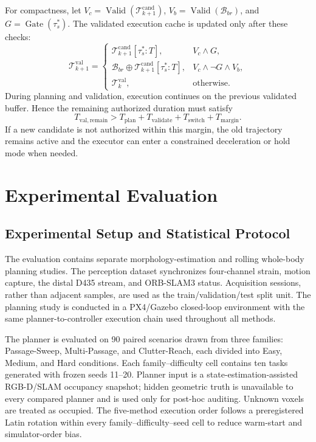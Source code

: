 \documentclass[journal,twoside]{IEEEtran}
\begin{document}
For compactness, let $V_c=\operatorname{Valid}(\mathcal T_{k+1}^{\mathrm{cand}})$, $V_b=\operatorname{Valid}(\mathcal B_{br})$, and $G=\operatorname{Gate}(\tau_s^*)$. The validated execution cache is updated only after these checks:
\begin{equation}
\mathcal T_{k+1}^{\mathrm{val}}=
\begin{cases}
\mathcal T_{k+1}^{\mathrm{cand}}[\tau_s^*:T],&V_c\land G,\\
\mathcal B_{br}\oplus\mathcal T_{k+1}^{\mathrm{cand}}[\tau_s^*:T],
&V_c\land\neg G\land V_b,\\
\mathcal T_k^{\mathrm{val}},&\text{otherwise}.
\end{cases}
\label{eq:validated_cache}
\end{equation}
During planning and validation, execution continues on the previous validated buffer. Hence the remaining authorized duration must satisfy
\begin{equation}
T_{\mathrm{val,remain}}>
T_{\mathrm{plan}}+T_{\mathrm{validate}}+T_{\mathrm{switch}}+T_{\mathrm{margin}}.
\label{eq:buffer_margin}
\end{equation}
If a new candidate is not authorized within this margin, the old trajectory remains active and the executor can enter a constrained deceleration or hold mode when needed.

\section{Experimental Evaluation}
\subsection{Experimental Setup and Statistical Protocol}
The evaluation contains separate morphology-estimation and rolling whole-body planning studies. The perception dataset synchronizes four-channel strain, motion capture, the distal D435 stream, and ORB-SLAM3 status. Acquisition sessions, rather than adjacent samples, are used as the train/validation/test split unit. The planning study is conducted in a PX4/Gazebo closed-loop environment with the same planner-to-controller execution chain used throughout all methods.

The planner is evaluated on 90 paired scenarios drawn from three families: Passage-Sweep, Multi-Passage, and Clutter-Reach, each divided into Easy, Medium, and Hard conditions. Each family--difficulty cell contains ten tasks generated with frozen seeds 11--20. Planner input is a state-estimation-assisted RGB-D/SLAM occupancy snapshot; hidden geometric truth is unavailable to every compared planner and is used only for post-hoc auditing. Unknown voxels are treated as occupied. The five-method execution order follows a preregistered Latin rotation within every family--difficulty--seed cell to reduce warm-start and simulator-order bias.
\end{document}

